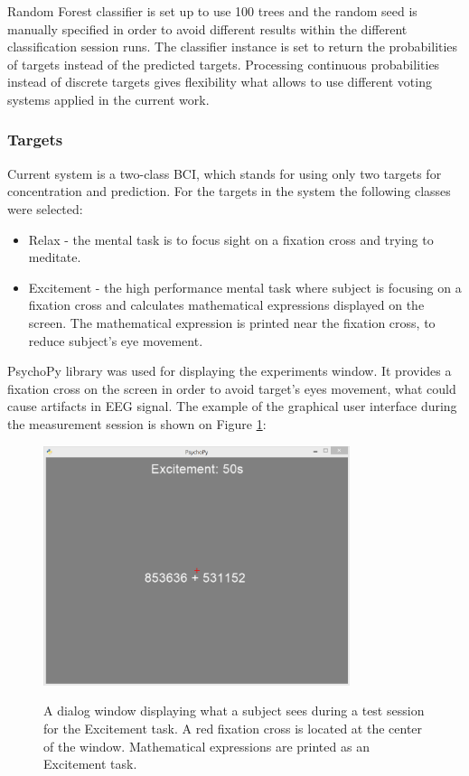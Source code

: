 \documentclass[12pt]{article}
\theoremstyle{definition}
\begin{document}
Random Forest classifier is set up to use 100 trees and the random seed is manually specified in order to avoid different results within the different classification session runs. The classifier instance is set to return the probabilities of targets instead of the predicted targets. Processing continuous probabilities instead of discrete targets gives flexibility what allows to use different voting systems applied in the current work.

\subsubsection{Targets}
Current system is a two-class BCI, which stands for using only two targets for concentration and prediction. For the targets in the system the following classes were selected: 
\begin{itemize}
\item Relax - the mental task is to focus sight on a fixation cross and trying to meditate.
\item Excitement - the high performance mental task where subject is focusing on a fixation cross and calculates mathematical expressions displayed on the screen. The mathematical expression is printed near the fixation cross, to reduce subject's eye movement.
\end{itemize}

PsychoPy \cite{psychopy} library was used for displaying the experiments window. It provides a fixation cross on the screen in order to avoid target's eyes movement, what could cause artifacts in EEG signal. The example of the graphical user interface during the measurement session is shown on Figure \ref{fig:test_ui}:

\begin{figure} [H]
\begin{center}
\label{fig:test_ui}
\includegraphics[width=0.8\textwidth]{test_ui}
\caption{A dialog window displaying what a subject sees during a test session for the Excitement task. A red fixation cross is located at the center of the window. Mathematical expressions are printed as an Excitement task.}
\end{center}
\end{figure}
\end{document}
